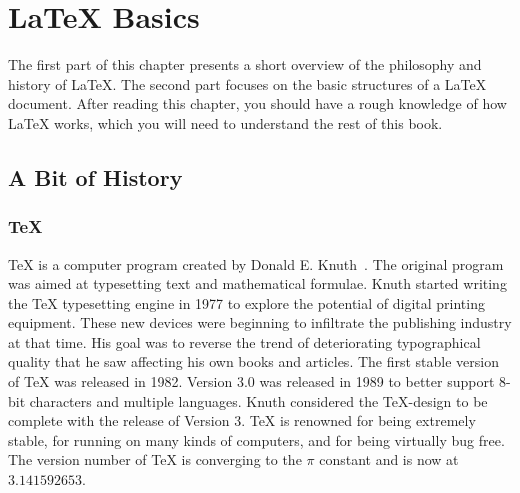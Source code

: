 %
%
%
%


\chapter{\LaTeX{} Basics}\label{chap:basics}
\begin{intro}
  The first part of this chapter presents a short
  overview of the philosophy and history of \LaTeX. The second part
  focuses on the basic structures of a \LaTeX{} document.
  After reading this chapter, you should have a rough knowledge
  of how \LaTeX{} works, which you will need to understand the rest
  of this book.
\end{intro}

\section{A Bit of History}
\subsection{\TeX}

\TeX{} is a computer program created by Donald E. Knuth~\cite{texbook}. The original program was aimed at typesetting text and
mathematical formulae. Knuth started writing the \TeX{} typesetting engine in
1977 to explore the potential of digital printing equipment. These new devices
were beginning to infiltrate the publishing industry at that time.
His goal was to reverse the trend of deteriorating typographical
quality that he saw affecting his own books and articles. The first stable
version of \TeX{} was released in 1982. Version 3.0 was released in 1989 to
better support 8-bit characters and multiple languages. Knuth considered the
\TeX-design to be complete with the release of Version 3. \TeX{} is renowned
for being extremely stable, for running on many kinds of computers,
and for being virtually bug free. The version number of \TeX{} is converging
to the \(\pi\) constant and is now at \(3.141592653\).

